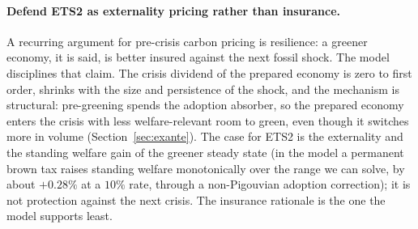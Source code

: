 \paragraph{Defend ETS2 as externality pricing rather than insurance.} A recurring
argument for pre-crisis carbon pricing is resilience: a greener economy, it is
said, is better insured against the next fossil shock. The model disciplines
that claim. The crisis dividend of the prepared economy is zero to first order,
shrinks with the size and persistence of the shock, and the mechanism is
structural: pre-greening spends the adoption absorber, so the prepared economy
enters the crisis with less welfare-relevant room to green, even though it
switches more in volume (Section~\ref{sec:exante}). The case for ETS2 is the externality and the standing welfare gain of the greener
steady state (in the model a permanent brown tax raises standing welfare
monotonically over the range we can solve, by about $+0.28\%$ at a $10\%$ rate,
through a non-Pigouvian adoption correction); it is not protection against the
next crisis. The insurance rationale is the one the model supports least.
